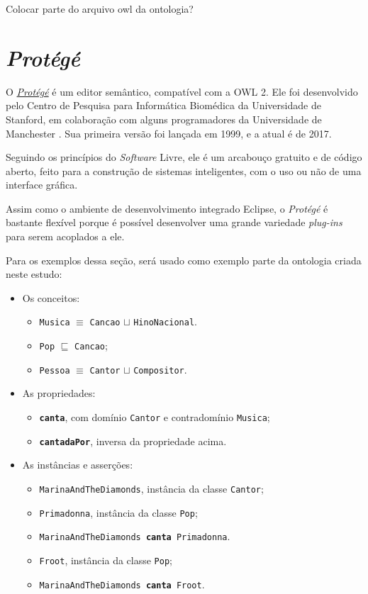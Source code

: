 {\color{red} Colocar parte do arquivo owl da ontologia?}

\section{\textit{Protégé}}

O \href{https://protege.stanford.edu}{\textit{Protégé}} é um editor semântico, compatível com a OWL 2. Ele foi desenvolvido pelo Centro de Pesquisa para Informática Biomédica da Universidade de Stanford, em colaboração com alguns programadores da Universidade de Manchester \cite{ferramentasProtege}. Sua primeira versão foi lançada em 1999, e a atual é de 2017.

Seguindo os princípios do \textit{Software} Livre, ele é um arcabouço gratuito e de código aberto, feito para a construção de sistemas inteligentes, com o uso ou não de uma interface gráfica.

Assim como o ambiente de desenvolvimento integrado Eclipse, o \textit{Protégé} é bastante flexível porque é possível desenvolver uma grande variedade \textit{plug-ins} para serem acoplados a ele.

Para os exemplos dessa seção, será usado como exemplo parte da ontologia criada neste estudo:

\begin{itemize}
	\item Os conceitos: 
	\begin{itemize}
		\item \texttt{Musica} $ \equiv $ \texttt{Cancao} $ \sqcup $ \texttt{HinoNacional}.
		\item \texttt{Pop} $ \sqsubseteq $ \texttt{Cancao};
		\item \texttt{Pessoa} $ \equiv $ \texttt{Cantor} $ \sqcup $ \texttt{Compositor}.
	\end{itemize}
	\item As propriedades:
	\begin{itemize}
		\item \textbf{\texttt{canta}}, com domínio \texttt{Cantor} e contradomínio \texttt{Musica};
		\item \textbf{\texttt{cantadaPor}}, inversa da propriedade acima.
	\end{itemize}
	\item As instâncias e asserções:
	\begin{itemize}
		\item \texttt{MarinaAndTheDiamonds}, instância da classe \texttt{Cantor};
		\item \texttt{Primadonna}, instância da classe \texttt{Pop};
		\item \texttt{MarinaAndTheDiamonds \textbf{canta} Primadonna}.
		\item \texttt{Froot}, instância da classe \texttt{Pop};
		\item \texttt{MarinaAndTheDiamonds \textbf{canta} Froot}.	
	\end{itemize}
\end{itemize}


